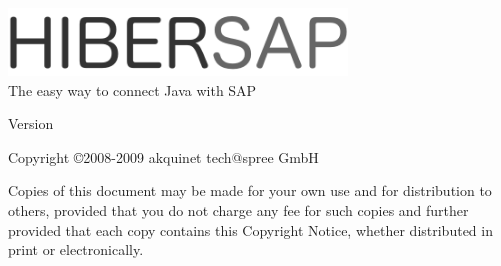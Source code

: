 \begin{titlepage}
	 \HRule 
	\begin{flushleft} 
	    \includegraphics[width=90mm]{HibersapLogo.png} \\
		\LARGE The easy way to connect Java with SAP \\
	\end{flushleft}
	\HRule {} 
	\begin{center} 
		\large Version \HibersapVersion 
	\end{center}
	\begin{center}
		\large Copyright \copyright 2008-2009 akquinet tech@spree GmbH 
	\end{center}
	\begin{center} 
		Copies of this document may be made for your own use and for distribution to others, 
		provided that you do not charge any fee for such copies and further provided that each 
		copy contains this Copyright Notice, whether distributed in print or
		electronically.
	\end{center}
\end{titlepage}
